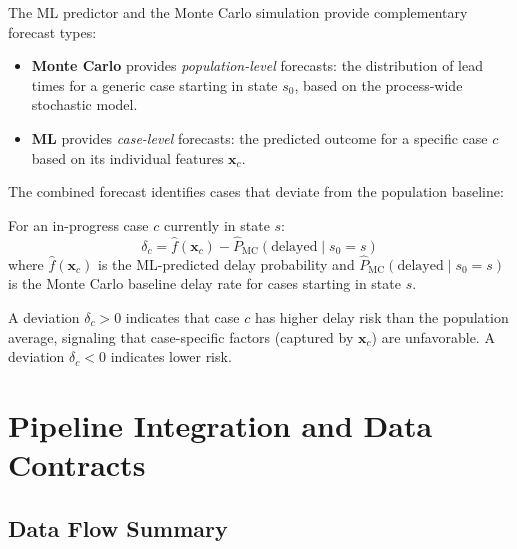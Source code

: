 The ML predictor and the Monte Carlo simulation provide complementary 
forecast types:

\begin{itemize}
    \item \textbf{Monte Carlo} provides \emph{population-level} forecasts: 
    the distribution of lead times for a generic case starting in state 
    $s_0$, based on the process-wide stochastic model.
    
    \item \textbf{ML} provides \emph{case-level} forecasts: the predicted 
    outcome for a specific case $c$ based on its individual features 
    $\mathbf{x}_c$.
\end{itemize}

The combined forecast identifies cases that deviate from the population 
baseline:

\begin{definition}
\label{def:deviation}
For an in-progress case $c$ currently in state $s$:
\begin{equation}
\label{eq:deviation}
\delta_c = \hat{f}(\mathbf{x}_c) - \hat{P}_{\text{MC}}(\text{delayed} \mid s_0 = s)
\end{equation}
where $\hat{f}(\mathbf{x}_c)$ is the ML-predicted delay probability and 
$\hat{P}_{\text{MC}}(\text{delayed} \mid s_0 = s)$ is the Monte Carlo 
baseline delay rate for cases starting in state $s$.

A deviation $\delta_c > 0$ indicates that case $c$ has higher delay risk 
than the population average, signaling that case-specific factors 
(captured by $\mathbf{x}_c$) are unfavorable. A deviation $\delta_c < 0$ 
indicates lower risk.
\end{definition}


\section{Pipeline Integration and Data Contracts}
\label{sec:integration}

\subsection{Data Flow Summary}
\label{sec:data-flow}

